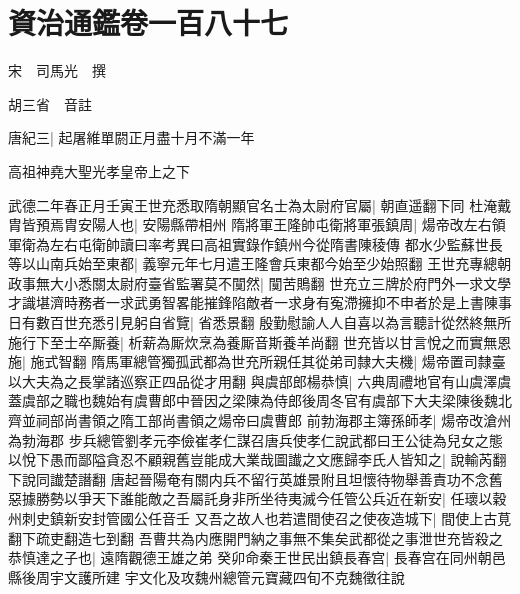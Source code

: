\section{資治通鑑卷一百八十七}
宋　司馬光　撰

胡三省　音註

唐紀三|{
	起屠維單閼正月盡十月不滿一年}


高祖神堯大聖光孝皇帝上之下

武德二年春正月壬寅王世充悉取隋朝顯官名士為太尉府官屬|{
	朝直遥翻下同}
杜淹戴胄皆預焉胄安陽人也|{
	安陽縣帶相州}
隋將軍王隆帥屯衛將軍張鎮周|{
	煬帝改左右領軍衛為左右屯衛帥讀曰率考異曰高祖實錄作鎮州今從隋書陳稜傳}
都水少監蘇世長等以山南兵始至東都|{
	義寧元年七月遣王隆會兵東都今始至少始照翻}
王世充專總朝政事無大小悉關太尉府臺省監署莫不闃然|{
	闃苦鵙翻}
世充立三牌於府門外一求文學才識堪濟時務者一求武勇智畧能摧鋒陷敵者一求身有寃滯擁抑不申者於是上書陳事日有數百世充悉引見躬自省覽|{
	省悉景翻}
殷勤慰諭人人自喜以為言聽計從然終無所施行下至士卒厮養|{
	析薪為厮炊烹為養厮音斯養羊尚翻}
世充皆以甘言悅之而實無恩施|{
	施式智翻}
隋馬軍總管獨孤武都為世充所親任其從弟司隸大夫機|{
	煬帝置司隸臺以大夫為之長掌諸巡察正四品從才用翻}
與虞部郎楊恭慎|{
	六典周禮地官有山虞澤虞蓋虞部之職也魏始有虞曹郎中晉因之梁陳為侍郎後周冬官有虞部下大夫梁陳後魏北齊並祠部尚書領之隋工部尚書領之煬帝曰虞曹郎}
前勃海郡主簿孫師孝|{
	煬帝改滄州為勃海郡}
步兵總管劉孝元李儉崔孝仁謀召唐兵使孝仁說武都曰王公徒為兒女之態以悅下愚而鄙隘貪忍不顧親舊豈能成大業哉圖䜟之文應歸李氏人皆知之|{
	說輸芮翻下說同䜟楚譖翻}
唐起晉陽奄有關内兵不留行英雄景附且坦懷待物舉善責功不念舊惡據勝勢以爭天下誰能敵之吾屬託身非所坐待夷滅今任管公兵近在新安|{
	任瓌以穀州刺史鎮新安封管國公任音壬}
又吾之故人也若遣間使召之使夜造城下|{
	間使上古莧翻下疏吏翻造七到翻}
吾曹共為内應開門納之事無不集矣武都從之事泄世充皆殺之恭慎達之子也|{
	遠隋觀德王雄之弟}
癸卯命秦王世民出鎮長春宫|{
	長春宫在同州朝邑縣後周宇文護所建}
宇文化及攻魏州總管元寶藏四旬不克魏徵往說

